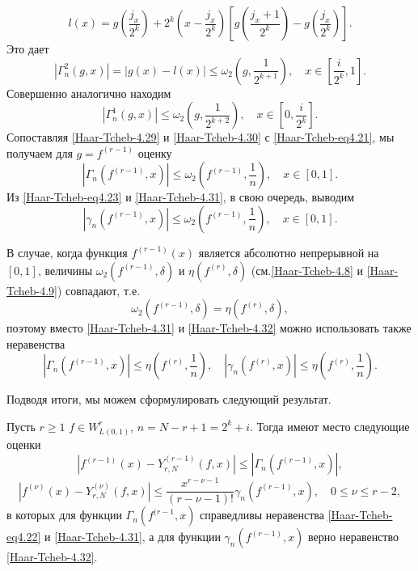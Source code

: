 $$
l(x)=g(\frac{j_x}{2^k})+2^k(x-\frac{j_x}{2^k})[g(\frac{j_x+1}{2^k})-g(\frac{j_x}{2^k})].
$$
Это дает
\begin{equation}\label{Haar-Tcheb-4.29}
|\Gamma_n^2(g,x)|=|g(x)-l(x)|\le \omega_2\left(g,\frac{1}{2^{k+1}}\right), \quad x\in[\frac{i}{2^k},1].
\end{equation}
Совершенно аналогично находим
\begin{equation}\label{Haar-Tcheb-4.30}
|\Gamma_n^1(g,x)|\le \omega_2\left(g,\frac{1}{2^{k+2}}\right), \quad x\in[0,\frac{i}{2^k}].
\end{equation}
Сопоставляя  \eqref{Haar-Tcheb-4.29} и \eqref{Haar-Tcheb-4.30} с \eqref{Haar-Tcheb-eq4.21}, мы получаем для $g=f^{(r-1)}$ оценку
\begin{equation}\label{Haar-Tcheb-4.31}
|\Gamma_n(f^{(r-1)},x)|\le \omega_2\left(f^{(r-1)},\frac{1}{n}\right), \quad x\in[0,1].
\end{equation}
Из \eqref{Haar-Tcheb-eq4.23} и \eqref{Haar-Tcheb-4.31}, в свою очередь, выводим
\begin{equation}\label{Haar-Tcheb-4.32}
|\gamma_n(f^{(r-1)},x)|\le \omega_2\left(f^{(r-1)},\frac{1}{n}\right), \quad x\in[0,1].
\end{equation}

В случае, когда  функция $f^{(r-1)}(x)$ является абсолютно непрерывной на $[0,1]$, величины $\omega_2\left(f^{(r-1)},\delta\right)$  и $\eta\left(f^{(r)},\delta\right)$ (см.\eqref{Haar-Tcheb-4.8} и \eqref{Haar-Tcheb-4.9}) совпадают, т.е. $$\omega_2\left(f^{(r-1)},\delta\right)=\eta\left(f^{(r)},\delta\right),$$
 поэтому вместо \eqref{Haar-Tcheb-4.31} и \eqref{Haar-Tcheb-4.32} можно использовать также неравенства
\begin{equation}\label{Haar-Tcheb-4.33}
|\Gamma_n(f^{(r-1)},x)|\le \eta\left(f^{(r)},\frac{1}{n}\right),\quad |\gamma_n(f^{(r)},x)|\le \eta\left(f^{(r)},\frac{1}{n}\right).
\end{equation}




Подводя итоги, мы можем сформулировать следующий результат.

\begin{theorem}\label{mixed-haar-est}
Пусть $r\ge1$ $f\in W^r_{L(0,1)}$, $n=N-r+1=2^k+i$.  Тогда имеют место следующие оценки
$$
|f^{(r-1)}(x)-Y_{r,N}^{(r-1)}(f,x)| \le |\Gamma_n(f^{(r-1)},x)|,
$$
$$
|f^{(\nu)}(x)-Y_{r,N}^{(\nu)}(f,x)| \le\frac{x^{r-\nu-1}}{(r-\nu-1)!}\gamma_n(f^{(r-1)},x),\quad  0\le\nu\le r-2,
$$
в которых для функции $\Gamma_n(f^{(r-1},x)$  справедливы неравенства \eqref{Haar-Tcheb-eq4.22} и \eqref{Haar-Tcheb-4.31}, а для функции $\gamma_n(f^{(r-1)},x)$ верно неравенство   \eqref{Haar-Tcheb-4.32}.
\end{theorem}







